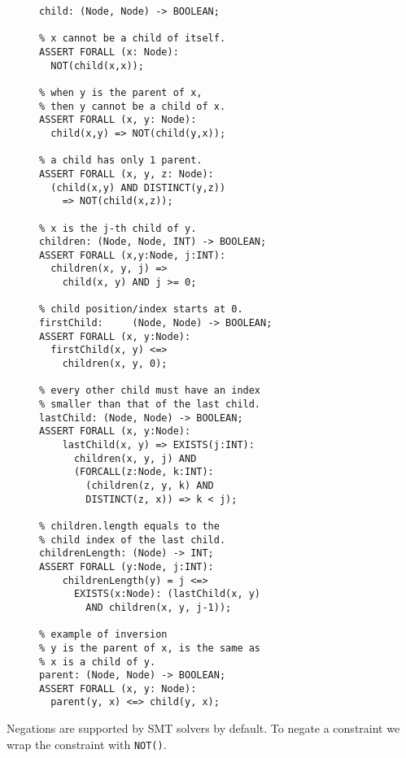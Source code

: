\begin{figure}
\begin{lstlisting}[caption=SMT functions for defining the children.length DOM operation.  We start with defining the parent-child relationships; then move on to the ordering of children; then use the child index of the last child to define and quantify the {\tt childrenLength()} boolean function,label=childrenLength]  
% child(x, y): x is a child of y.
child: (Node, Node) -> BOOLEAN;	

% x cannot be a child of itself.
ASSERT FORALL (x: Node):	
  NOT(child(x,x));
	
% when y is the parent of x,
% then y cannot be a child of x.  
ASSERT FORALL (x, y: Node):
  child(x,y) => NOT(child(y,x));
  
% a child has only 1 parent.
ASSERT FORALL (x, y, z: Node):
  (child(x,y) AND DISTINCT(y,z)) 
    => NOT(child(x,z));

% x is the j-th child of y.
children: (Node, Node, INT) -> BOOLEAN;
ASSERT FORALL (x,y:Node, j:INT): 
  children(x, y, j) => 
    child(x, y) AND j >= 0;

% child position/index starts at 0.
firstChild:		(Node, Node) -> BOOLEAN;
ASSERT FORALL (x, y:Node):
  firstChild(x, y) <=> 
    children(x, y, 0);

% every other child must have an index 
% smaller than that of the last child.
lastChild: (Node, Node) -> BOOLEAN;	
ASSERT FORALL (x, y:Node): 	
	lastChild(x, y) => EXISTS(j:INT): 
	  children(x, y, j) AND 
	  (FORCALL(z:Node, k:INT): 
	    (children(z, y, k) AND 
	    DISTINCT(z, x)) => k < j);

% children.length equals to the
% child index of the last child.
childrenLength:	(Node) -> INT;
ASSERT FORALL (y:Node, j:INT):
	childrenLength(y) = j <=> 
	  EXISTS(x:Node): (lastChild(x, y) 
	    AND children(x, y, j-1));

% example of inversion
% y is the parent of x, is the same as 
% x is a child of y.
parent: (Node, Node) -> BOOLEAN; 
ASSERT FORALL (x, y: Node): 
  parent(y, x) <=> child(y, x); 
\end{lstlisting} 
\end{figure}

Negations are supported by SMT solvers by default.  To negate a constraint we wrap the constraint with {\tt NOT()}.

